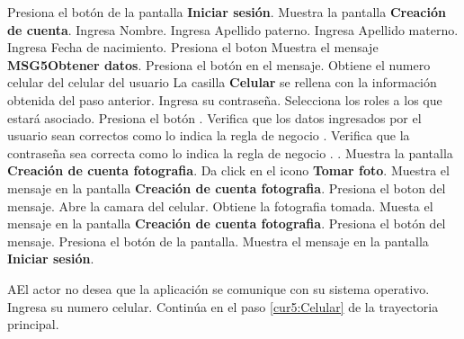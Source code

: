  \begin{UCtrayectoria}
 	
	 \UCpaso [\UCactor] Presiona el botón  de la pantalla \textbf{Iniciar sesión}.
	 \UCpaso Muestra la pantalla \textbf{Creación de cuenta}.
	 \UCpaso [\UCactor] Ingresa Nombre.
	 \UCpaso [\UCactor] Ingresa Apellido paterno.
	 \UCpaso [\UCactor] Ingresa Apellido materno.
	 \UCpaso [\UCactor] Ingresa Fecha de nacimiento.
	 \UCpaso [\UCactor] Presiona el boton  
	 \UCpaso Muestra el mensaje \textbf{MSG5{Obtener datos}}.
	 \UCpaso [\UCactor] Presiona el botón  en el mensaje.
	 \UCpaso Obtiene el numero celular del celular del usuario
	 \UCpaso La casilla \textbf{Celular} se rellena con la información obtenida del paso anterior.
	 \UCpaso [\UCactor] Ingresa su contraseña.\label{cur5:Celular}
	 \UCpaso [\UCactor] Selecciona los roles a los que estará asociado.
	 \UCpaso [\UCactor] Presiona el botón . \label{cur3:Doctor}
	 \UCpaso Verifica que los datos ingresados por el usuario sean correctos como lo indica la regla de negocio . 
	 \UCpaso Verifica que la contraseña sea correcta como lo indica la regla de negocio . .
	 \UCpaso Muestra la pantalla \textbf{Creación de cuenta fotografia}.
	 \UCpaso [\UCactor] Da click en el icono \textbf{Tomar foto}. 
	 \UCpaso Muestra el mensaje  en la pantalla \textbf{Creación de cuenta fotografia}.
	 \UCpaso [\UCactor] Presiona el boton  del mensaje.
	 \UCpaso Abre la camara del celular.
	 \UCpaso Obtiene la fotografia tomada.
	 \UCpaso Muesta el mensaje  en la pantalla \textbf{Creación de cuenta fotografia}.
	 \UCpaso [\UCactor] Presiona el botón  del mensaje.
	 \UCpaso [\UCactor] Presiona el botón  de la pantalla.\label{cur3:foto}
	 \UCpaso Muestra el mensaje  en la pantalla \textbf{Iniciar sesión}.
	 

 \end{UCtrayectoria}

 \begin{UCtrayectoriaA}{A}{El actor no desea que la aplicación se comunique con su sistema operativo.}
 	\UCpaso [\UCactor] Ingresa su numero celular.
 	\UCpaso Continúa en el paso \ref{cur5:Celular} de la trayectoria principal.
    
 \end{UCtrayectoriaA}
 
